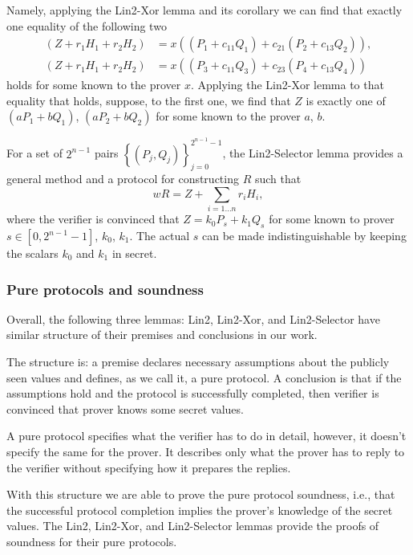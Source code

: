 \documentclass{mathcryptology} %
\theoremstyle{title}
\theoremstyle{titleof}
\begin{document}
    Namely, applying the Lin2-Xor lemma and its corollary we can find that exactly one equality of the following two
    \begin{align*}
        (Z+r_{1}H_{1}+r_{2}H_{2}) & =x((P_{1}+c_{11}Q_{1})+c_{21}(P_{2}+c_{13}Q_{2})),\\
        (Z+r_{1}H_{1}+r_{2}H_{2}) & = x((P_{3}+c_{11}Q_{3})+c_{23}(P_{4}+c_{13}Q_{4}))
    \end{align*}
    holds for some known to the prover $x$. Applying the Lin2-Xor lemma to that equality that holds, suppose, to the first one, we find that $Z$ is exactly one of $(a P_{1}+b Q_{1})$, $(a P_{2}+b Q_{2})$ for some known to the prover $a$, $b$.

    For a set of ${2}^{n-1}$ pairs ${\left\{ \left(P_{j}, Q_{j}\right)\right\}}_{j=0}^{2^{n-1}-1}$, the Lin2-Selector lemma provides a general method and a protocol for constructing $R$ such that
    \begin{equation*}
        w R = Z+ \sum_{i=1\dots{}n}r_iH_i,
    \end{equation*}
    where the verifier is convinced that $Z=k_{0}P_{s}+k_{1}Q_{s}$ for some known to prover $s\in\left[0, 2^{n-1}-1\right]$, $k_{0}$, $k_{1}$. The actual $s$ can be made indistinguishable by keeping the scalars $k_{0}$ and $k_{1}$ in secret.
    

\subsubsection{Pure protocols and soundness}
    Overall, the following three lemmas: Lin2, Lin2-Xor, and Lin2-Selector have similar structure of their premises and conclusions in our work.

    The structure is: a premise declares necessary assumptions about the publicly seen values and defines, as we call it, a pure protocol. A conclusion is that if the assumptions hold and the protocol is successfully completed, then verifier is convinced that prover knows some secret values.

    A pure protocol specifies what the verifier has to do in detail, however, it doesn't specify the same for the prover. It describes only what the prover has to reply to the verifier without specifying how it prepares the replies.

    With this structure we are able to prove the pure protocol soundness, i.e., that the successful protocol completion implies the prover's knowledge of the secret values. The Lin2, Lin2-Xor, and Lin2-Selector lemmas provide the proofs of soundness for their pure protocols.
\end{document}
